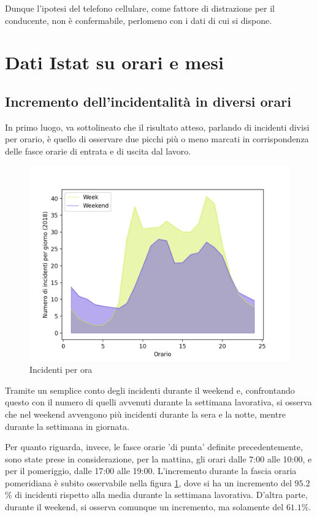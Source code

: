 \documentclass[a4paper]{report}
\begin{document}
Dunque l'ipotesi del telefono cellulare, come fattore di distrazione per il conducente, 
non è confermabile, perlomeno con i dati di cui si dispone.

\section{Dati Istat su orari e mesi}

\subsection{Incremento dell'incidentalità in diversi orari}

In primo luogo, va sottolineato che il risultato atteso, 
parlando di incidenti divisi per orario, è quello di osservare due picchi più o meno marcati 
in corrispondenza delle fasce orarie di entrata e di uscita dal lavoro.

\begin{figure}
    \includegraphics[width=\linewidth]{../src/incidenti/incidenti_senza_coords/ore_punta/week_weekend.png}
    \caption{Incidenti per ora}
    \label{fig:week-weekend}
\end{figure}

Tramite un semplice conto degli incidenti durante il weekend e, 
confrontando questo con il numero di quelli avvenuti durante la 
settimana lavorativa, si osserva che nel weekend avvengono più incidenti 
durante la sera e la notte, mentre durante la settimana in giornata.

Per quanto riguarda, invece, le fasce orarie 'di punta' definite precedentemente, 
sono state prese in considerazione, per la mattina, gli orari dalle 7:00 alle 10:00, 
e per il pomeriggio, dalle 17:00 alle 19:00.
L'incremento durante la fascia oraria pomeridiana è subito osservabile nella figura 
\ref{fig:week-weekend}, dove si ha un incremento del $95.2$\% di incidenti rispetto 
alla media durante la settimana lavorativa. 
D'altra parte, durante il weekend, si osserva comunque un incremento, ma solamente del $61.1$\%.
\end{document}
